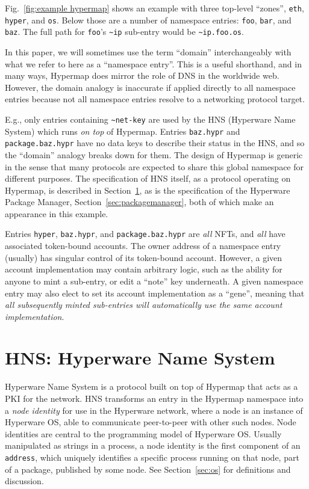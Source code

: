 \documentclass[runningheads]{llncs}
\begin{document}
Fig.~\ref{fig:example hypermap} shows an example with three top-level ``zones'', \verb|eth|, \verb|hyper|, and \verb|os|.
Below those are a number of namespace entries: \verb|foo|, \verb|bar|, and \verb|baz|.
The full path for \verb|foo|'s \verb|~ip| sub-entry would be \verb|~ip.foo.os|.

In this paper, we will sometimes use the term ``domain'' interchangeably with what we refer to here as a ``namespace entry''.
This is a useful shorthand, and in many ways, Hypermap does mirror the role of DNS in the worldwide web.
However, the domain analogy is inaccurate if applied directly to all namespace entries because not all namespace entries resolve to a networking protocol target.

E.g., only entries containing \verb|~net-key| are used by the HNS (Hyperware Name System) which runs \textit{on top} of Hypermap.
Entries \verb|baz.hypr| and \verb|package.baz.hypr| have no data keys to describe their status in the HNS, and so the ``domain'' analogy breaks down for them.
The design of Hypermap is generic in the sense that many protocols are expected to share this global namespace for different purposes.
The specification of HNS itself, as a protocol operating on Hypermap, is described in Section~\ref{sec:hns}, as is the specification of the Hyperware Package Manager, Section~\ref{sec:packagemanager}, both of which make an appearance in this example.

Entries \verb|hyper|, \verb|baz.hypr|, and \verb|package.baz.hypr| are \textit{all} NFTs, and \textit{all} have associated token-bound accounts.
The owner address of a namespace entry (usually) has singular control of its token-bound account.
However, a given account implementation may contain arbitrary logic, such as the ability for anyone to mint a sub-entry, or edit a ``note'' key underneath.
A given namespace entry may also elect to set its account implementation as a ``gene'', meaning that \textit{all subsequently minted sub-entries will automatically use the same account implementation}.

\section{HNS: Hyperware Name System}
\label{sec:hns}

Hyperware Name System is a protocol built on top of Hypermap that acts as a PKI for the network.
HNS transforms an entry in the Hypermap namespace into a \textit{node identity} for use in the Hyperware network, where a node is an instance of Hyperware OS, able to communicate peer-to-peer with other such nodes.
Node identities are central to the programming model of Hyperware OS.
Usually manipulated as strings in a process, a node identity is the first component of an \verb|address|, which uniquely identifies a specific process running on that node, part of a package, published by some node. See Section~\ref{sec:os} for definitions and discussion.
\end{document}

